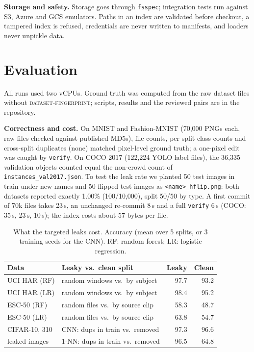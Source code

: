 \documentclass[sigconf,nonacm]{acmart}
\begin{document}
\textbf{Storage and safety.} Storage goes through \texttt{fsspec}; integration tests run against S3,
Azure and GCS emulators. Paths in an index are validated before checkout, a tampered index is refused,
credentials are never written to manifests, and loaders never unpickle data.

\section{Evaluation}\label{sec:eval}
All runs used two vCPUs. Ground truth was computed from the raw dataset files without
\textsc{dataset-fingerprint}; scripts, results and the reviewed pairs are in the repository.

\textbf{Correctness and cost.} On MNIST \cite{lecun1998mnist} and Fashion-MNIST \cite{xiao2017fashion}
(70,000 PNGs each, raw files checked against published MD5s), file counts, per-split class counts and
cross-split duplicates (none) matched pixel-level ground truth; a one-pixel edit was caught by
\texttt{verify}. On COCO 2017 \cite{lin2014coco} (122,224 YOLO label files), the 36,335 validation objects
counted equal the non-crowd count of \texttt{instances\_val2017.json}. To test the leak rate we planted 50
test images in train under new names and 50 flipped test images as \texttt{<name>\_hflip.png}: both
datasets reported exactly 1.00\% (100/10,000), split 50/50 by type. A first commit of 70k files takes
23\,s, an unchanged re-commit 8\,s and a full \texttt{verify} 6\,s (COCO: 35\,s, 23\,s, 10\,s); the index
costs about 57 bytes per file.

\begin{table}[t]
\caption{What the targeted leaks cost. Accuracy (mean over 5 splits, or 3 training seeds for the CNN).
RF: random forest; LR: logistic regression.}\label{tab:impact}
\small
\begin{tabular}{@{}llrr@{}}
\toprule
Data & Leaky vs.\ clean split & Leaky & Clean \\
\midrule
UCI HAR (RF) & random windows vs.\ by subject & 97.7 & 93.2 \\
UCI HAR (LR) & random windows vs.\ by subject & 98.4 & 95.2 \\
ESC-50 (RF) & random files vs.\ by source clip & 58.3 & 48.7 \\
ESC-50 (LR) & random files vs.\ by source clip & 63.8 & 54.7 \\
\midrule
CIFAR-10, 310 & CNN: dups in train vs.\ removed & 97.3 & 96.6 \\
\quad leaked images & 1-NN: dups in train vs.\ removed & 96.5 & 64.8 \\
\bottomrule
\end{tabular}
\end{table}
\end{document}
